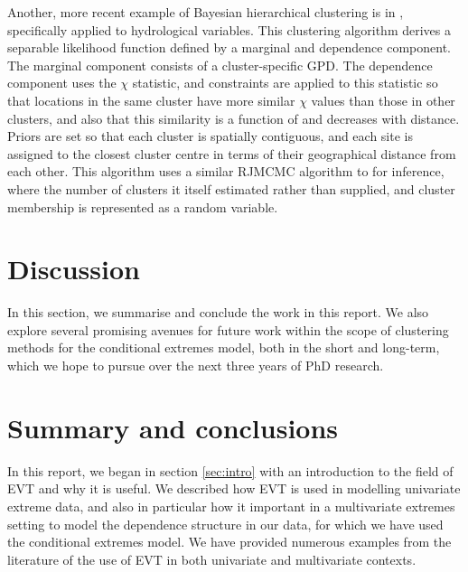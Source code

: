 \documentclass{article}
\numberwithin{equation}{section}
\begin{document}

Another, more recent example of Bayesian hierarchical clustering is in \citet{Rohrbeck2021}, specifically applied to hydrological variables. 
This clustering algorithm derives a separable likelihood function defined by a marginal and dependence component.
The marginal component consists of a cluster-specific GPD.
The dependence component uses the $\chi$ statistic, and constraints are applied to this statistic so that locations in the same cluster have more similar $\chi$ values than those in other clusters, and also that this similarity is a function of and decreases with distance.
Priors are set so that each cluster is spatially contiguous, and each site is assigned to the closest cluster centre in terms of their geographical distance from each other.
This algorithm uses a similar RJMCMC algorithm to \citet{Bottolo2003} for inference, where the number of clusters it itself estimated rather than supplied, and cluster membership is represented as a random variable. 


\newpage
\section{Discussion} \label{sec:discussion}

In this section, we summarise and conclude the work in this report. 
We also explore several promising avenues for future work within the scope of clustering methods for the conditional extremes model, both in the short and long-term, which we hope to pursue over the next three years of PhD research. 

\section{Summary and conclusions}

In this report, we began in section \ref{sec:intro} with an introduction to the field of EVT and why it is useful.
We described how EVT is used in modelling univariate extreme data, and also in particular how it important in a multivariate extremes setting to model the dependence structure in our data, for which we have used the conditional extremes model.
We have provided numerous examples from the literature of the use of EVT in both univariate and multivariate contexts. 
\end{document}
